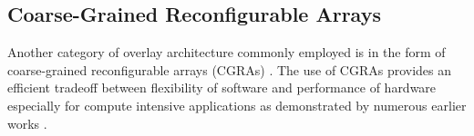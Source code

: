 \subsection{Coarse-Grained Reconfigurable Arrays}
Another category of overlay architecture commonly employed is in the form of coarse-grained reconfigurable arrays (CGRAs) \cite{kissler2006dynamically, ferreira2011fpga, shukla2006quku, Lin:2012:EDC:2460216.2460227,capalijia2013pipelined, dspoverlay}. The use of CGRAs provides an efficient tradeoff between flexibility of software and performance of hardware especially for compute intensive applications as demonstrated by numerous earlier works \cite{tessier01reconfigurable,compton02reconfigurable}.

